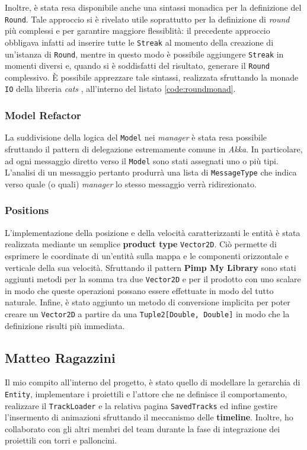 Inoltre, è stata resa disponibile anche una sintassi monadica per la definizione del \texttt{Round}. Tale approccio si è
rivelato utile soprattutto per la definizione di \textit{round} più complessi e per garantire maggiore flessiblità: il
precedente approccio obbligava infatti ad inserire tutte le \texttt{Streak} al momento della creazione di un'istanza di
\texttt{Round}, mentre in questo modo è possibile aggiungere \texttt{Streak} in momenti diversi e, quando si è
soddisfatti del risultato, generare il \texttt{Round} complessivo. È possibile apprezzare tale sintassi, realizzata
sfruttando la monade \texttt{IO} della libreria \textit{cats} \cite{cats-effects}, all'interno del listato
\ref{code:roundmonad}.


\subsubsection{Model Refactor}
La suddivisione della logica del \texttt{Model} nei \textit{manager} è stata resa possibile sfruttando il pattern di
delegazione estremamente comune in \textit{Akka}. In particolare, ad ogni messaggio diretto verso il \texttt{Model} sono
stati assegnati uno o più tipi. L'analisi di un messaggio pertanto produrrà una lista di \texttt{MessageType} che indica
verso quale (o quali) \textit{manager} lo stesso messaggio verrà ridirezionato.

\subsubsection{Positions}
L'implementazione della posizione e della velocità caratterizzanti le entità è stata realizzata mediante un semplice
\textbf{product type} \texttt{Vector2D}. Ciò permette di esprimere le coordinate di un'entità sulla mappa e le
componenti orizzontale e verticale della sua velocità. Sfruttando il pattern \textbf{Pimp My Library} sono stati
aggiunti metodi per la somma tra due \texttt{Vector2D} e per il prodotto con uno scalare in modo che queste operazioni
possano essere effettuate in modo del tutto naturale. Infine, è stato aggiunto un metodo di conversione implicita per
poter creare un \texttt{Vector2D} a partire da una \texttt{Tuple2[Double, Double]} in modo che la definizione risulti
più immediata.

\subsection{Matteo Ragazzini}\label{subsec:matteo-ragazzini}
Il mio compito all'interno del progetto, è stato quello di modellare la gerarchia di \texttt{Entity},  implementare i
proiettili e l'attore che ne definisce il comportamento, realizzare il \texttt{TrackLoader} e la relativa pagina
\texttt{SavedTracks} ed infine gestire l'insermento di animazioni sfruttando il meccanismo delle \textbf{timeline}.
Inoltre, ho collaborato con gli altri membri del team durante la fase di integrazione dei proiettili con torri e palloncini.


